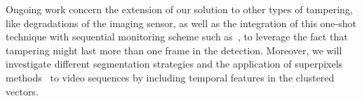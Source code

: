 \documentclass{llncs}
\begin{document}
Ongoing work concern the extension of our solution to other types of tampering, like degradations of the imaging sensor, as well as the integration of this one-shot technique with sequential monitoring scheme such as~\cite{alippi2010detecting}, to leverage the fact that tampering might last more than one frame in the detection. Moreover, we will investigate different segmentation strategies and the application of superpixels methods~\cite{Susstrunk2012} to video sequences by including temporal features in the clustered vectors.








%	
%	
\end{document}

